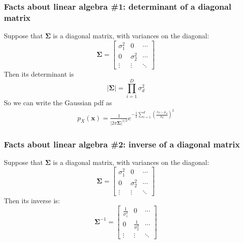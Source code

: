 \documentclass{beamer}
\begin{document}
\begin{frame}
  \frametitle{Facts about linear algebra \#1: determinant of a diagonal matrix}
  Suppose that $\mathbf{\Sigma}$ is a diagonal matrix, with variances on the diagonal:
  \begin{displaymath}
    \mathbf{\Sigma}=\left[\begin{array}{ccc}\sigma_1^2&0&\cdots\\
        0&\sigma_2^2&\cdots\\\vdots&\vdots&\ddots\end{array}\right]
  \end{displaymath}
  Then its determinant is
  \begin{displaymath}
    |\mathbf{\Sigma}| = \prod_{i=1}^D\sigma_d^2
  \end{displaymath}
  So we can write the Gaussian pdf as
  \begin{align*}
    p_X(\mathbf{x})
    =\frac{1}{|2\pi\mathbf{\Sigma}|^{1/2}}e^{-\frac{1}{2}\sum_{i=1}^d\left(\frac{x_d-\mu_d}{\sigma_d}\right)^2}
  \end{align*}
\end{frame}

\begin{frame}
  \frametitle{Facts about linear algebra \#2: inverse of a diagonal matrix}
  Suppose that $\mathbf{\Sigma}$ is a diagonal matrix, with variances on the diagonal:
  \begin{displaymath}
    \mathbf{\Sigma}=\left[\begin{array}{ccc}\sigma_1^2&0&\cdots\\
        0&\sigma_2^2&\cdots\\\vdots&\vdots&\ddots\end{array}\right]
  \end{displaymath}
  Then its inverse is:
  \begin{displaymath}
    \mathbf{\Sigma}^{-1}= \left[\begin{array}{ccc}\frac{1}{\sigma_1^2}&0&\cdots\\
        0&\frac{1}{\sigma_2^2}&\cdots\\\vdots&\vdots&\ddots\end{array}\right]
  \end{displaymath}
\end{frame}
\end{document}
